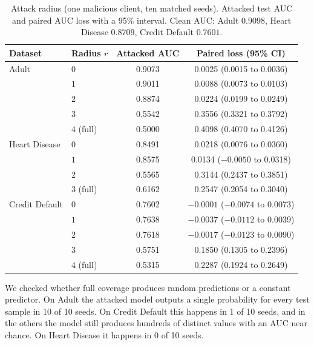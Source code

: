 \documentclass[11pt]{article}
\newcommand{\rev}[1]{#1}
\newcommand{\revfloat}[1]{#1}
\begin{document}
\begin{table}[htbp]
\centering
\revfloat{\caption{Attack radius (one malicious client, ten matched seeds). Attacked test AUC and paired AUC loss with a 95\% interval. Clean AUC: Adult $0.9098$, Heart Disease $0.8709$, Credit Default $0.7601$.}\label{tab:radius}}
\begin{tabular}{llcc}
\toprule
\rev{Dataset} & \rev{Radius $r$} & \rev{Attacked AUC} & \rev{Paired loss (95\% CI)} \\
\midrule
\rev{Adult} & \rev{$0$} & \rev{0.9073} & \rev{0.0025 (0.0015 to 0.0036)} \\
\rev{} & \rev{$1$} & \rev{0.9011} & \rev{0.0088 (0.0073 to 0.0103)} \\
\rev{} & \rev{$2$} & \rev{0.8874} & \rev{0.0224 (0.0199 to 0.0249)} \\
\rev{} & \rev{$3$} & \rev{0.5542} & \rev{0.3556 (0.3321 to 0.3792)} \\
\rev{} & \rev{$4$ (full)} & \rev{0.5000} & \rev{0.4098 (0.4070 to 0.4126)} \\
\midrule
\rev{Heart Disease} & \rev{$0$} & \rev{0.8491} & \rev{0.0218 (0.0076 to 0.0360)} \\
\rev{} & \rev{$1$} & \rev{0.8575} & \rev{0.0134 ($-0.0050$ to 0.0318)} \\
\rev{} & \rev{$2$} & \rev{0.5565} & \rev{0.3144 (0.2437 to 0.3851)} \\
\rev{} & \rev{$3$ (full)} & \rev{0.6162} & \rev{0.2547 (0.2054 to 0.3040)} \\
\midrule
\rev{Credit Default} & \rev{$0$} & \rev{0.7602} & \rev{$-0.0001$ ($-0.0074$ to 0.0073)} \\
\rev{} & \rev{$1$} & \rev{0.7638} & \rev{$-0.0037$ ($-0.0112$ to 0.0039)} \\
\rev{} & \rev{$2$} & \rev{0.7618} & \rev{$-0.0017$ ($-0.0123$ to 0.0090)} \\
\rev{} & \rev{$3$} & \rev{0.5751} & \rev{0.1850 (0.1305 to 0.2396)} \\
\rev{} & \rev{$4$ (full)} & \rev{0.5315} & \rev{0.2287 (0.1924 to 0.2649)} \\
\bottomrule
\end{tabular}
\end{table}

\rev{We checked whether full coverage produces random predictions or a constant predictor. On Adult the attacked model outputs a single probability for every test sample in 10 of 10 seeds. On Credit Default this happens in 1 of 10 seeds, and in the others the model still produces hundreds of distinct values with an AUC near chance. On Heart Disease it happens in 0 of 10 seeds.}
\end{document}
